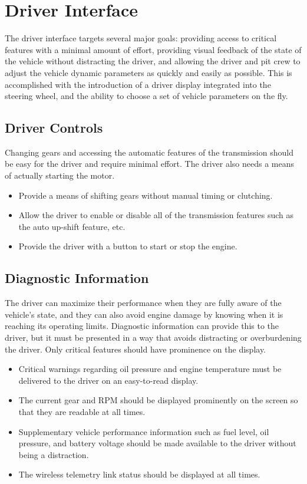\section{Driver Interface}

The driver interface targets several major goals: providing access to critical features with a minimal amount of effort, providing visual feedback of the state of the vehicle without distracting the driver, and allowing the driver and pit crew to adjust the vehicle dynamic parameters as quickly and easily as possible. This is accomplished with the introduction of a driver display integrated into the steering wheel, and the ability to choose a set of vehicle parameters on the fly.

\subsection{Driver Controls}

Changing gears and accessing the automatic features of the transmission should be easy for the driver and require minimal effort. The driver also needs a means of actually starting the motor.

\begin{itemize}
\item Provide a means of shifting gears without manual timing or clutching.
\item Allow the driver to enable or disable all of the transmission features such as the auto up-shift feature, etc.
\item Provide the driver with a button to start or stop the engine. 
\end{itemize}

\subsection{Diagnostic Information}

The driver can maximize their performance when they are fully aware of the vehicle's state, and they can also avoid engine damage by knowing when it is reaching its operating limits. Diagnostic information can provide this to the driver, but it must be presented in a way that avoids distracting or overburdening the driver. Only critical features should have prominence on the display.

\begin{itemize}
\item Critical warnings regarding oil pressure and engine temperature must be delivered to the driver on an easy-to-read display.
\item The current gear and RPM should be displayed prominently on the screen so that they are readable at all times.
\item Supplementary vehicle performance information such as fuel level, oil pressure, and battery voltage should be made available to the driver without being a distraction.
\item The wireless telemetry link status should be displayed at all times.
\end{itemize}

